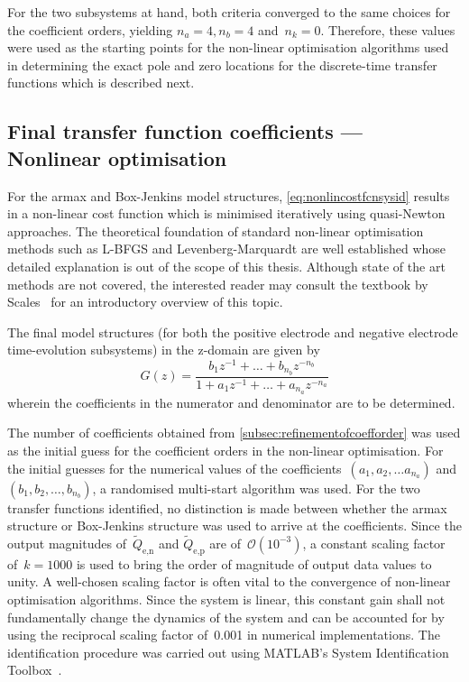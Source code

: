 For the two subsystems at hand, both  criteria converged to the same choices for
the coefficient orders,  yielding ${n_a = 4,  n_b = 4}$ and~${n_k  = 0}$. Therefore,
these values  were used as the  starting points for the  non-linear optimisation
algorithms  used in  determining  the  exact pole  and  zero  locations for  the
discrete-time transfer functions which is described next.

\subsection{Final transfer function coefficients --- Nonlinear optimisation}

For         the         \gls{armax}        and         Box-Jenkins         model
structures, \cref{eq:nonlincostfcnsysid} results  in a non-linear  cost function
which  is  minimised iteratively  using  quasi-Newton  approaches. The  theoretical
foundation  of  standard non-linear  optimisation  methods  such as  L-BFGS  and
Levenberg-Marquardt are  well established whose  detailed explanation is  out of
the scope of this thesis. Although state of the art methods are not covered, the
interested reader  may consult the  textbook by Scales~\cite{Scales1985}  for an
introductory overview of this topic.

The  final  model structures  (for  both  the  positive electrode  and  negative
electrode time-evolution subsystems) in the z-domain are given by
\begin{equation}
    G(z) = \frac{b_1z^{-1} + \dots + b_{n_b}z^{-{n_b}}}{1 + a_1z^{-1} + \dots + a_{n_a}z^{-{n_a}}}\label{eq:genericZtf}
\end{equation}
wherein the coefficients in the numerator and denominator are to be determined.

The  number of  coefficients obtained  from \cref{subsec:refinementofcoefforder}
was  used as  the initial  guess for  the coefficient  orders in  the non-linear
optimisation.  For  the  initial  guesses   for  the  numerical  values  of  the
coefficients~$(a_1, a_2,  \dots a_{n_a})$ and ${(b_1, b_2, \dots  , b_{n_b} )}$, a
randomised  multi-start  algorithm was  used.  For  the two  transfer  functions
identified, no distinction is made  between whether the \gls{armax} structure or
Box-Jenkins structure was  used to arrive at the coefficients.  Since the output
magnitudes of~$\widetilde{Q}_{\text{e,n}}$  and $\widetilde{Q}_{\text{e,p}}$ are
of~$\mathcal{O}(10^{-3})$,  a  constant  scaling   factor  of~${k  =  1000}$  is
used  to  bring the  order  of  magnitude of  output  data  values to  unity.  A
well-chosen  scaling factor  is often  vital  to the  convergence of  non-linear
optimisation algorithms.  Since the system  is linear, this constant  gain shall
not fundamentally change the dynamics of the  system and can be accounted for by
using the reciprocal  scaling factor of~0.001 in  numerical implementations. The
identification procedure  was carried  out using MATLAB's  System Identification
Toolbox~\cite{matlabsysidtool}.

